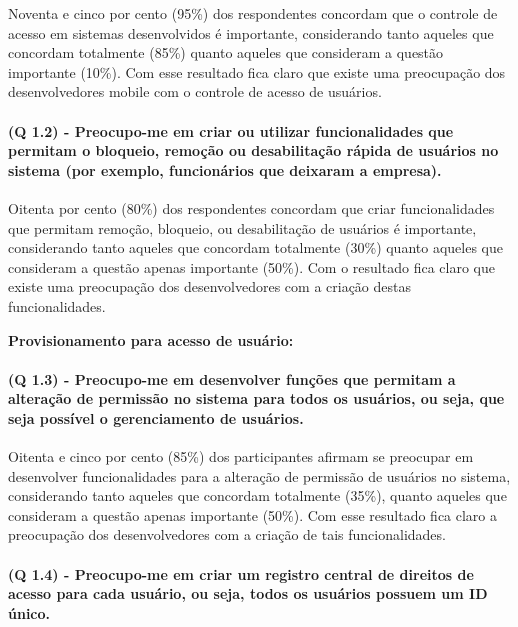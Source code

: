 Noventa e cinco por cento (95{\%}) dos respondentes concordam que o controle de acesso em sistemas desenvolvidos é importante, considerando tanto aqueles que concordam totalmente (85{\%}) quanto aqueles que consideram a questão importante (10{\%}). Com esse resultado fica claro que existe uma preocupação dos desenvolvedores mobile com o controle de acesso de usuários.


\paragraph{\textbf{(Q 1.2)} - Preocupo-me em criar ou utilizar funcionalidades que permitam o bloqueio, remoção ou desabilitação rápida de usuários no sistema (por exemplo, funcionários que deixaram a empresa).}

Oitenta por cento (80{\%}) dos respondentes concordam que criar funcionalidades que permitam remoção, bloqueio, ou desabilitação de usuários é importante, considerando tanto aqueles que concordam totalmente (30{\%}) quanto aqueles que consideram a questão apenas importante (50{\%}). Com o resultado fica claro que existe uma preocupação dos desenvolvedores com a criação destas funcionalidades.

\vspace{0.5cm}
\noindent\textbf{Provisionamento para acesso de usuário:}

\paragraph{\textbf{(Q 1.3)} - Preocupo-me em desenvolver funções que permitam a alteração de permissão no sistema para todos os usuários, ou seja, que seja possível o gerenciamento de usuários.}


Oitenta e cinco por cento (85{\%}) dos participantes afirmam se preocupar em desenvolver funcionalidades para a alteração de permissão de usuários no sistema, considerando tanto aqueles que concordam totalmente (35{\%}), quanto aqueles que consideram a questão apenas importante (50{\%}). Com esse resultado fica claro a preocupação dos desenvolvedores com a criação de tais funcionalidades.

\paragraph{\textbf{(Q 1.4)} - Preocupo-me em criar um registro central de direitos de acesso para cada usuário, ou seja, todos os usuários possuem um ID único.}


